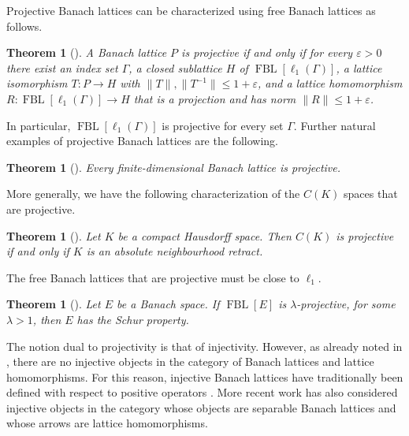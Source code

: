 \documentclass{memo-l}
\newtheorem{thm}[theorem]{Theorem}
\theoremstyle{definition}
\theoremstyle{remark}
\numberwithin{section}{chapter}
\numberwithin{equation}{chapter}
\newcommand{\el}[1]{\ensuremath{\ell_{#1}}}
\newcommand{\FBL}[1]{\operatorname{FBL}[#1]}
\begin{document}
Projective Banach lattices can be characterized using free Banach
lattices as follows.

\begin{thm}[{\cite[Theorem 10.3]{de_pagter_wickstead2015}}]
    A Banach lattice $P$ is projective if and only if for every
    $\varepsilon >0$ there exist an
    index set $\Gamma$, a closed sublattice $H$ of $\FBL{\el 1(\Gamma
    )}$, a lattice isomorphism $T\colon P\to H$ with
    $\|T\|,\|T^{-1}\|\le 1+\varepsilon $, and a lattice homomorphism $R\colon
    \FBL{\el 1(\Gamma )}\to H$ that is a projection and has norm
    $\|R\|\le 1+\varepsilon $.
\end{thm}

In particular, $\FBL{\el 1(\Gamma )}$ is projective for every set
$\Gamma $. Further natural examples of projective Banach lattices are
the following.

\begin{thm}[{\cite[Theorem 11.1]{de_pagter_wickstead2015}}]
    Every finite-dimensional Banach lattice is projective.
\end{thm}

More generally, we have the following characterization of the $C(K)$
spaces that are projective.

\begin{thm}[{\cite[Theorem 1.4]{aviles_martinez-cervantes_abellan2020}}]
    Let $K$ be a compact Hausdorff space. Then $C(K)$ is projective if
    and only if $K$ is an absolute neighbourhood retract.
\end{thm}

The free Banach lattices that are projective must be close to $\el 1$.

\begin{thm}[{\cite[Theorem 1.3]{aviles_martinez-cervantes_abellan2020}}]
    Let $E$ be a Banach space. If $\FBL E$ is $\lambda $-projective,
    for some $\lambda >1$, then $E$ has the Schur property.
\end{thm}

The notion dual to projectivity is that of injectivity. However, as
already noted in \cite[Footnote 1]{de_pagter_wickstead2015}, there are
no injective objects in the category of Banach lattices and lattice
homomorphisms. For this reason, injective Banach lattices have
traditionally been defined with respect to positive operators
\cite{haydon1977}. More recent work \cite{aviles_tradacete2023} has also
considered injective objects in the category whose objects are
separable Banach lattices and whose arrows are lattice homomorphisms.
\end{document}
